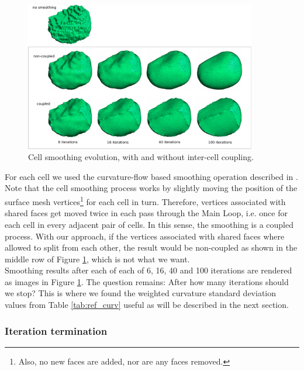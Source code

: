\documentclass[a4paper,10pt]{article}
\begin{document}
\begin{figure}[H]
\begin{center}
\includegraphics[width=0.9\textwidth]{images/evolution.pdf}
\end{center}
\caption{Cell smoothing evolution, with and without inter-cell coupling.}
\label{fig:cell_morph}
\end{figure}

For each cell we used the curvature-flow based smoothing operation described in \cite{Desbrun:1999:IFI:311535.311576}. Note that the cell smoothing process works by slightly moving the position of the surface mesh vertices\footnote{Also, no new faces are added, nor are any faces removed.} for each cell in turn. Therefore, vertices associated with shared faces get moved twice in each pass through the Main Loop, i.e. once for each cell in every adjacent pair of cells. In this sense, the smoothing is a coupled process. With our approach, if the vertices associated with shared faces where allowed to split from each other, the result would be non-coupled as shown in the middle row of Figure \ref{fig:cell_morph}, which is not what we want.\\

Smoothing results after each of each of 6, 16, 40 and 100 iterations are rendered as images in Figure \ref{fig:cell_morph}.
The question remains: After how many iterations should we stop? This is where we found the weighted curvature standard deviation values from Table \ref{tab:ref_curv} useful as will be described in the next section.\\

\subsubsection{Iteration termination} \label{sec:termination}
\end{document}
